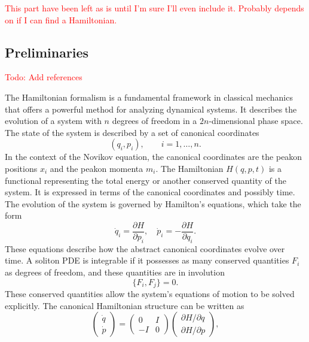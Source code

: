 \documentclass[english,master]{liumaiex}
\theoremstyle{plain}
\theoremstyle{definition}
\newcommand\todo[1]{\textcolor{red}{#1}}
\begin{document}
\todo{This part have been left as is until I'm sure I'll even include it. Probably depends on if I can find a Hamiltonian.}

\subsection{Preliminaries}
\todo{Todo: Add references}

The Hamiltonian formalism is a fundamental framework in classical mechanics that offers a powerful method for analyzing dynamical systems. It describes the evolution of a system with $n$ degrees of freedom in a $2n$-dimensional phase space. The state of the system is described by a set of canonical coordinates
\begin{equation}
	 (q_i,p_i), \qquad i = 1,\dots,n.
\end{equation}
In the context of the Novikov equation, the canonical coordinates are the peakon positions $x_i$ and the peakon momenta $m_i$. The Hamiltonian $H(q,p,t)$ is a functional representing the total energy or another conserved quantity of the system. It is expressed in terms of the canonical coordinates and possibly time. The evolution of the system is governed by Hamilton's equations, which take the form
%
\begin{equation}
	\dot{q}_i = \frac{\partial H}{\partial p_i}, \quad
	\dot{p}_i = -\frac{\partial H}{\partial q_i}.
\end{equation}
%
These equations describe how the abstract canonical coordinates evolve over time. A soliton PDE is integrable if it possesses as many conserved quantities $F_i$ as degrees of freedom, and these quantities are in involution
%
\begin{equation}
	\{F_i, F_j\} = 0.
\end{equation}
%
These conserved quantities allow the system's equations of motion to be solved explicitly. The canonical Hamiltonian structure can be written as
%
\begin{equation}
\begin{pmatrix}
	\dot{q} \\
	\dot{p}
\end{pmatrix} =
\begin{pmatrix}
	0 & I \\
	-I & 0
\end{pmatrix}
\begin{pmatrix}
	\partial H / \partial q \\
	\partial H / \partial p
\end{pmatrix},
\end{equation}
\end{document}
